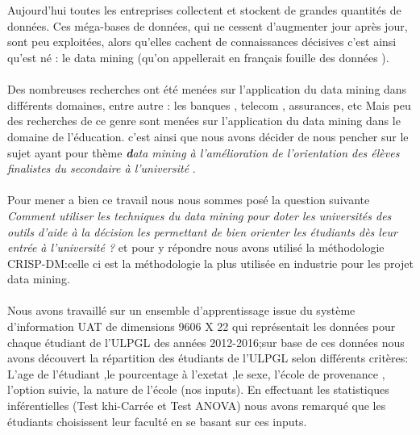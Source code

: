 \makeatletter
\renewenvironment{abstract}{%
	\if@twocolumn
	\section*{\abstractname}%
	\else %
	\begin{center}%
		{\bfseries\Large\textit {\abstractname}\vspace{\z@}}%
	\end{center}%
	\quotation
	\fi}
{\if@twocolumn\else\endquotation\fi}
\makeatother
{} 
\begin{abstract}
	\thispagestyle{plain} 
Aujourd'hui toutes les entreprises collectent et stockent de grandes quantités de données. Ces méga-bases de données, qui ne cessent d'augmenter jour après jour, sont peu exploitées, alors qu'elles cachent de connaissances décisives c'est ainsi qu'est né : le data mining   (qu'on appellerait en français fouille des données ).
\paragraph{}
Des nombreuses recherches ont été menées sur l'application du data mining dans différents domaines,  entre autre : les banques , telecom , assurances, etc
Mais peu des recherches de ce genre sont menées sur l'application du data mining dans le domaine de l'éducation. c'est ainsi que nous avons décider 
de nous pencher sur le sujet ayant pour thème \textit{ \textbf data mining à l’amélioration  de l'orientation des élèves finalistes du secondaire à l'université } .
\paragraph{}
Pour mener a bien ce travail nous nous sommes posé la question suivante \emph{Comment utiliser les techniques  du data mining pour doter les universités des outils d'aide à la décision les permettant de bien orienter les étudiants dès leur entrée à l'université ?  } et pour y répondre nous avons utilisé la méthodologie  \ac{CRISP-DM}:celle ci est la méthodologie la plus utilisée en industrie pour les projet data mining.
\paragraph{}
Nous avons travaillé sur un ensemble d'apprentissage issue du système d'information UAT de dimensions 9606 X 22 qui représentait les données pour chaque étudiant de l'ULPGL des années 2012-2016;sur base de ces données nous avons découvert la répartition des étudiants de l'ULPGL selon différents critères:  L'age de l'étudiant ,le pourcentage à l'exetat ,le sexe, l'école de provenance , l'option suivie, la nature de l'école  (nos inputs). 
En effectuant les statistiques inférentielles (Test khi-Carrée et Test ANOVA) nous avons remarqué que les étudiants choisissent leur faculté  en se basant sur ces inputs.

\end{abstract}

